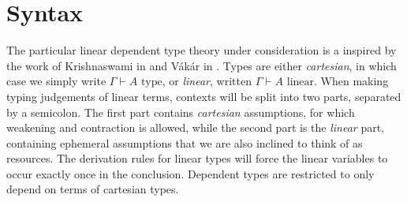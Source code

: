 \section{Syntax}\label{syntax}
The particular linear dependent type theory under consideration is a inspired by the work of Krishnaswami in \cite{krishnaswami} and Vákár in \cite{vakar14}. Types are either \textit{cartesian}, in which case we simply write $\Gamma \vdash A \text{ type}$, or \textit{linear}, written $\Gamma \vdash A \text{ linear}$. When making typing judgements of linear terms, contexts will be split into two parts, separated by a semicolon. The first part contains \textit{cartesian} assumptions, for which weakening and contraction is allowed, while the second part is the \textit{linear} part, containing ephemeral assumptions that we are also inclined to think of as resources. The derivation rules for linear types will force the linear variables to occur exactly once in the conclusion. Dependent types are restricted to only depend on terms of cartesian types. 
